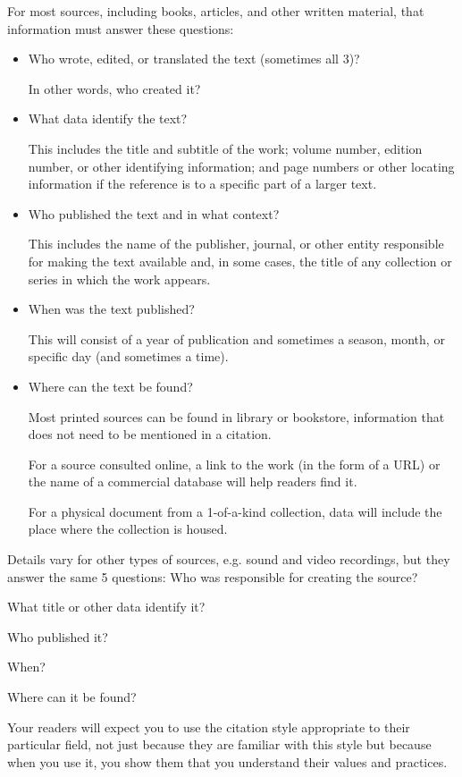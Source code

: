 \documentclass[oneside]{book}
\numberwithin{equation}{section}
\begin{document}
For most sources, including books, articles, and other written material, that information must answer these questions:
\begin{itemize}
    \item Who wrote, edited, or translated the text (sometimes all 3)?
    
    In other words, who created it?
    \item What data identify the text?
    
    This includes the title and subtitle of the work; volume number, edition number, or other identifying information; and page numbers or other locating information if the reference is to a specific part of a larger text.
    \item Who published the text and in what context?
    
    This includes the name of the publisher, journal, or other entity responsible for making the text available and, in some cases, the title of any collection or series in which the work appears.
    \item When was the text published?
    
    This will consist of a year of publication and sometimes a season, month, or specific day (and sometimes a time).
    \item Where can the text be found?
    
    Most printed sources can be found in library or bookstore, information that does not need to be mentioned in a citation.
    
    For a source consulted online, a link to the work (in the form of a URL) or the name of a commercial database will help readers find it.
    
    For a physical document from a 1-of-a-kind collection, data will include the place where the collection is housed.
\end{itemize}
Details vary for other types of sources, e.g. sound and video recordings, but they answer the same 5 questions: Who was responsible for creating the source?

What title or other data identify it?

Who published it?

When?

Where can it be found?

%
Your readers will expect you to use the citation style appropriate to their particular field, not just because they are familiar with this style but because when you use it, you show them that you understand their values and practices.
\end{document}

